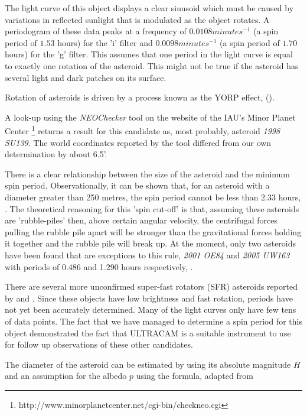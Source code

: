   The light curve of this object displays a clear sinusoid which must be caused by variations in reflected sunlight that is modulated as the object rotates. A periodogram of these data peaks at a frequency of $0.0108 minutes^{-1}$ (a spin period of $1.53$ hours) for the 'i' filter and $0.0098 minutes^{-1}$ (a spin period of $1.70$ hours) for the 'g' filter. This assumes that one period in the light curve is equal to exactly one rotation of the asteroid. This might not be true if the asteroid has several light and dark patches on its surface. 

  Rotation of asteroids is driven by a process known as the YORP effect, (\cite{yorpeffect}). 

  A look-up using the \emph{NEOChecker} tool on the website of the IAU's Minor Planet Center \footnote{http://www.minorplanetcenter.net/cgi-bin/checkneo.cgi} returns a result for this candidate as, most probably, asteroid \emph{1998 SU139}. The world coordinates reported by the tool differed from our own determination by about 6.5'. 

  There is a clear relationship between the size of the asteroid and the minimum spin period. Observationally, it can be shown that, for an asteroid with a diameter greater than 250 metres, the spin period cannot be less than 2.33 hours, \cite{Jacobson2014}. The theoretical reasoning for this 'spin cut-off'  is that, assuming these asteroids are 'rubble-piles' then, above certain angular velocity, the centrifugal forces pulling the rubble pile apart will be stronger than the gravitational forces holding it together and the rubble pile will break up. At the moment, only two asteroids have been found that are exceptions to this rule, \emph{2001 OE84} and \emph{2005 UW163} with periods of 0.486 and 1.290 hours respectively, \cite{Chang2014}. 

  There are several more unconfirmed super-fast rotators (SFR) asteroids reported by \cite{Masiero2009} and \cite{Dermawan2011}. Since these objects have low brightness and fast rotation, periods have not yet been accurately determined. Many of the light curves only have few tens of data points. The fact that we have managed to determine a spin period for this object demonstrated the fact that ULTRACAM is a suitable instrument to use for follow up observations of these other candidates.  

  The diameter of the asteroid can be estimated by using its absolute magnitude $H$ and an assumption for the albedo $p$ using the formula, adapted from \cite{Jewitt2013}


